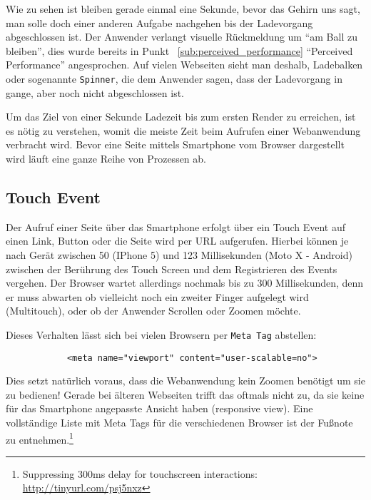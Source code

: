 	Wie zu sehen ist bleiben gerade einmal eine Sekunde, bevor das Gehirn uns sagt, man solle doch einer anderen Aufgabe nachgehen bis der Ladevorgang abgeschlossen ist. Der Anwender verlangt visuelle Rückmeldung um "`am Ball zu bleiben"', dies wurde bereits in Punkt ~\ref{sub:perceived_performance} "`Perceived Performance"' angesprochen. Auf vielen Webseiten sieht man deshalb, Ladebalken oder sogenannte \texttt{Spinner}, die dem Anwender sagen, dass der Ladevorgang in gange, aber noch nicht abgeschlossen ist.

	Um das Ziel von einer Sekunde Ladezeit bis zum ersten Render zu erreichen, ist es nötig zu verstehen, womit die meiste Zeit beim Aufrufen einer Webanwendung verbracht wird. Bevor eine Seite mittels Smartphone vom Browser dargestellt wird läuft eine ganze Reihe von Prozessen ab.



	\subsection{Touch Event} %
	\label{sub:touch_event}
		Der Aufruf einer Seite über das Smartphone erfolgt über ein Touch Event auf einen Link, Button oder die Seite wird per URL aufgerufen. Hierbei können je nach Gerät zwischen 50 (IPhone 5) und 123 Millisekunden (Moto X - Android) zwischen der Berührung des Touch Screen und dem Registrieren des Events vergehen.\autocite{venturebeat} Der Browser wartet allerdings nochmals bis zu 300 Millisekunden, denn er muss abwarten ob vielleicht noch ein zweiter Finger aufgelegt wird (Multitouch), oder ob der Anwender Scrollen oder Zoomen möchte.\autocite{google11}

		Dieses Verhalten lässt sich bei vielen Browsern per \texttt{Meta Tag} abstellen:

		\begin{lstlisting}
			<meta name="viewport" content="user-scalable=no">
		\end{lstlisting}

		Dies setzt natürlich voraus, dass die Webanwendung kein Zoomen benötigt um sie zu bedienen! Gerade bei älteren Webseiten trifft das oftmals nicht zu, da sie keine für das Smartphone angepasste Ansicht haben (responsive view). Eine vollständige Liste mit Meta Tags für die verschiedenen Browser ist der Fußnote zu entnehmen.\footnote{Suppressing 300ms delay for touchscreen interactions: \url{http://tinyurl.com/psj5nxz}}


